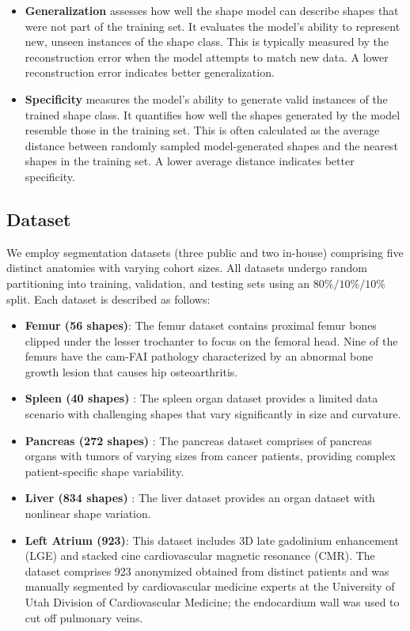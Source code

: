 \begin{enumerate}
\begin{itemize}
    \item \textbf{Generalization} assesses how well the shape model can describe shapes that were not part of the training set. It evaluates the model's ability to represent new, unseen instances of the shape class. This is typically measured by the reconstruction error when the model attempts to match new data. A lower reconstruction error indicates better generalization.

    \item \textbf{Specificity} measures the model's ability to generate valid instances of the trained shape class. It quantifies how well the shapes generated by the model resemble those in the training set. This is often calculated as the average distance between randomly sampled model-generated shapes and the nearest shapes in the training set. A lower average distance indicates better specificity. 
    \end{itemize}
\end{enumerate}
\subsection{Dataset}
We employ segmentation datasets (three public and two in-house) comprising five distinct anatomies with varying cohort sizes. All datasets undergo random partitioning into training, validation, and testing sets using an \(80\%/10\%/10\%\) split. Each dataset is described as follows:
\begin{itemize}
\item \textbf{Femur (56 shapes)}: The femur dataset contains proximal femur bones clipped under the lesser trochanter to focus on the femoral head. Nine of the femurs have the cam-FAI pathology characterized by an abnormal bone growth lesion that causes hip osteoarthritis. 
\item \textbf{Spleen (40 shapes)} \cite{simpson2019large}: The spleen organ dataset provides a limited data scenario with challenging shapes that vary significantly in size and curvature.
\item \textbf{Pancreas (272 shapes)} \cite{simpson2019large}: The pancreas dataset comprises of pancreas organs with tumors of varying sizes from cancer patients, providing complex patient-specific shape variability.
\item \textbf{Liver (834 shapes)} \cite{Ma-2021-AbdomenCT-1K}: The liver dataset provides an organ dataset with nonlinear shape variation.
\item \textbf{Left Atrium (923)}: This dataset includes 3D late gadolinium enhancement (LGE) and stacked cine cardiovascular magnetic resonance (CMR). The dataset comprises 923 anonymized obtained from distinct patients and was manually segmented by cardiovascular medicine experts at the University of Utah Division of Cardiovascular Medicine; the endocardium wall was used to cut off pulmonary veins.
\end{itemize}

